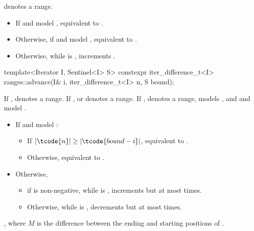 \begin{itemdescr}
\pnum
\expects
{} denotes a range.

\pnum
\effects
\begin{itemize}
\item If  and  model ,
  equivalent to .
\item Otherwise, if  and  model ,
  equivalent to .
\item Otherwise, while  is ,
  increments .
\end{itemize}
\end{itemdescr}

%
\begin{itemdecl}
template<Iterator I, Sentinel<I> S>
  constexpr iter_difference_t<I> ranges::advance(I& i, iter_difference_t<I> n, S bound);
\end{itemdecl}

\begin{itemdescr}
\pnum
\expects
If ,  denotes a range.
If ,  or  denotes a range.
If ,  denotes a range,
 models , and
 and  model .

\pnum
\effects
\begin{itemize}
\item If  and  model :
  \begin{itemize}
  \item If \brk{}$|\tcode{n}| \ge |\tcode{bound - i}|$,
    equivalent to .
  \item Otherwise, equivalent to .
  \end{itemize}
\item Otherwise,
  \begin{itemize}
  \item if  is non-negative,
    while  is ,
    increments  but at most  times.
  \item Otherwise,
    while  is ,
    decrements  but at most  times.
  \end{itemize}
\end{itemize}

\pnum
\returns
{}, where $M$ is the difference between
the ending and starting positions of .
\end{itemdescr}

